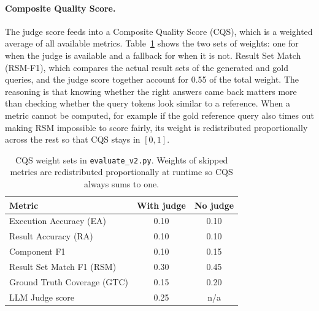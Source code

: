 \documentclass[11pt,a4paper]{article}
\begin{document}
\paragraph{Composite Quality Score.}
The judge score feeds into a Composite Quality Score (CQS), which is a
weighted average of all available metrics. Table~\ref{tab:cqs-weights}
shows the two sets of weights: one for when the judge is available and
a fallback for when it is not. Result Set Match (RSM-F1), which
compares the actual result sets of the generated and gold queries, and
the judge score together account for 0.55 of the total weight. The
reasoning is that knowing whether the right answers came back matters
more than checking whether the query tokens look similar to a
reference. When a metric cannot be computed, for example if the gold
reference query also times out making RSM impossible to score fairly,
its weight is redistributed proportionally across the rest so that CQS
stays in $[0,1]$.

\begin{table}[H]
    \centering
    \begin{tabular}{lcc}
        \toprule
        \textbf{Metric} & \textbf{With judge} & \textbf{No judge} \\
        \midrule
        Execution Accuracy (EA)       & 0.10 & 0.10 \\
        Result Accuracy (RA)          & 0.10 & 0.10 \\
        Component F1                  & 0.10 & 0.15 \\
        Result Set Match F1 (RSM)     & 0.30 & 0.45 \\
        Ground Truth Coverage (GTC)   & 0.15 & 0.20 \\
        LLM Judge score               & 0.25 & n/a  \\
        \bottomrule
    \end{tabular}
    \caption{CQS weight sets in \texttt{evaluate\_v2.py}. Weights of
    skipped metrics are redistributed proportionally at runtime so
    CQS always sums to one.}
    \label{tab:cqs-weights}
\end{table}
\end{document}
